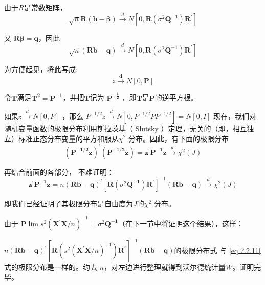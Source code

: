 \begin{myproof}[定理的证明]
    由于$ R $是常数矩阵，
    \begin{equation}
        \sqrt{n} \boldsymbol{R(b-\beta)} \stackrel{d}{\longrightarrow} N \left[0, \boldsymbol{R}\left(\sigma^{2} 
        \boldsymbol{Q^{-1}}\right) \boldsymbol{R^{\prime}}\right]  
    \end{equation}
    
    又 $ \boldsymbol{R \beta = q} $，因此
    \begin{equation}
        \sqrt{n}(\boldsymbol{R b-q}) \stackrel{d}{\longrightarrow} N\left[0, \boldsymbol{R}\left(\sigma^{2} \boldsymbol{Q^{-1}}\right) \boldsymbol{R^{\prime}}\right]
    \end{equation}

    为方便起见，将此写成:
    \begin{equation}
        z \stackrel{\boldsymbol{d}}{\longrightarrow} N[0, \boldsymbol{P}]
    \end{equation}
    
    令$ \boldsymbol{T} $满足$ \boldsymbol{T^{2}=P^{-1}}$，并把$ \boldsymbol{T} $记为 $ \boldsymbol{P^{-\frac{1}{2}}} $ ，即$ \boldsymbol{T} $是$ \boldsymbol{P} $的逆平方根。

    如果$ z \stackrel{d}{\longrightarrow} N[0, P] $ ，那么 $ P^{-1 / 2} z \stackrel{d}{\longrightarrow} N\left[0, P^{-1 / 2} P P^{-1 / 2}\right]=N[0, I] $
    现在，我们对随机变量函数的极限分布利用斯拉茨基（ Slutsky ）定理，无关的（即，相互独立）标准正态分布变量的平方和服从$ \chi^{2} $ 分布。因此，有下面的极限分布
    \begin{equation}
      \left( \boldsymbol{P^{-1 / 2} z} \right)^{\prime}\left( \boldsymbol{P^{-1 / 2} z} \right)
      = \boldsymbol{z^{\prime} P^{-1} z} \stackrel{d}{\longrightarrow} \chi^{2}(J) 
    \end{equation}

    再结合前面的各部分， 不难证明：
    \begin{equation}
        \boldsymbol{z^{\prime} P^{-1} z} =n(\boldsymbol{R b-q})^{\prime}\left[\boldsymbol{R}\left(\sigma^{2} \boldsymbol{Q^{-1}}\right) 
        \boldsymbol{R^{\prime}} \right]^{-1}(\boldsymbol{R b-q}) \stackrel{d}{\longrightarrow} \chi^{2}(J)
        \label{eq 7.2.11}
    \end{equation}

    即我们已经证明了其极限分布是自由度为$ J $的$ \chi^{2} $ 分布。
    
    由于 $ \boldsymbol{P}  \lim s^{2}\left( \boldsymbol{X^{\prime} X} / n\right)^{-1}=\sigma^{2} \boldsymbol{Q^{-1}} $（在下一节中将证明这个结果），这样：

    $ n(\boldsymbol{R b-q})^{\prime}\left[\boldsymbol{R} \left(s^{2}\left(\boldsymbol{X^{\prime} X} / n\right)^{-1}\right) 
    \boldsymbol{R}^{\prime}\right]^{-1}(\boldsymbol{R b-q}) $的极限分布式
    与 \ref{eq 7.2.11} 式的极限分布是一样的。约去 $ n $，对左边进行整理就得到沃尔德统计量$ W $。证明完毕。
\end{myproof}

